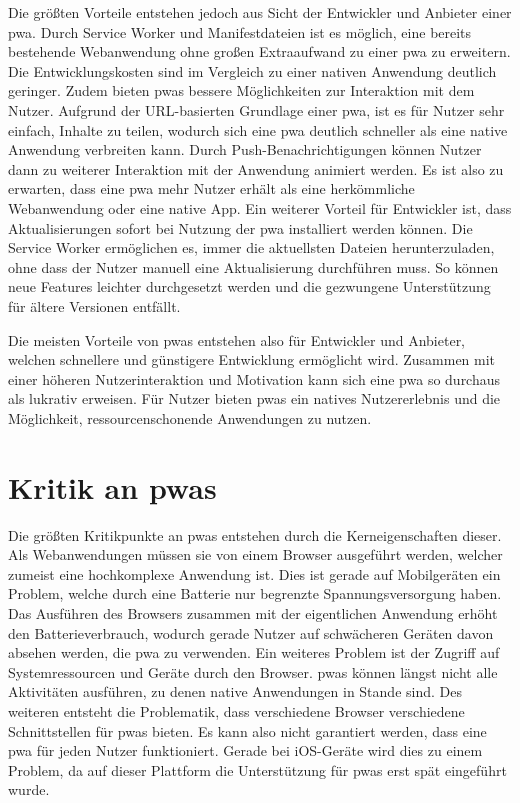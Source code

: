 \documentclass[12pt, parskip=half]{scrartcl}       %
\begin{document}
Die größten Vorteile entstehen jedoch aus Sicht der Entwickler und Anbieter einer \ac{pwa}.
Durch Service Worker und Manifestdateien ist es möglich, eine bereits bestehende Webanwendung ohne großen Extraaufwand zu einer \ac{pwa} zu erweitern.
Die Entwicklungskosten sind im Vergleich zu einer nativen Anwendung deutlich geringer.
Zudem bieten \acp{pwa} bessere Möglichkeiten zur Interaktion mit dem Nutzer.
Aufgrund der URL-basierten Grundlage einer \ac{pwa}, ist es für Nutzer sehr einfach, Inhalte zu teilen, wodurch sich eine \ac{pwa} deutlich schneller als eine native Anwendung verbreiten kann.
Durch Push-Benachrichtigungen können Nutzer dann zu weiterer Interaktion mit der Anwendung animiert werden.
Es ist also zu erwarten, dass eine \ac{pwa} mehr Nutzer erhält als eine herkömmliche Webanwendung oder eine native App.
Ein weiterer Vorteil für Entwickler ist, dass Aktualisierungen sofort bei Nutzung der \ac{pwa} installiert werden können.
Die Service Worker ermöglichen es, immer die aktuellsten Dateien herunterzuladen, ohne dass der Nutzer manuell eine Aktualisierung durchführen muss.
So können neue Features leichter durchgesetzt werden und die gezwungene Unterstützung für ältere Versionen entfällt.

Die meisten Vorteile von \acp{pwa} entstehen also für Entwickler und Anbieter, welchen schnellere und günstigere Entwicklung ermöglicht wird.
Zusammen mit einer höheren Nutzerinteraktion und Motivation kann sich eine \ac{pwa} so durchaus als lukrativ erweisen.
Für Nutzer bieten \acp{pwa} ein natives Nutzererlebnis und die Möglichkeit, ressourcenschonende Anwendungen zu nutzen.


\section{Kritik an \acp{pwa}}

Die größten Kritikpunkte an \acp{pwa} entstehen durch die Kerneigenschaften dieser.
Als Webanwendungen müssen sie von einem Browser ausgeführt werden, welcher zumeist eine hochkomplexe Anwendung ist.
Dies ist gerade auf Mobilgeräten ein Problem, welche durch eine Batterie nur begrenzte Spannungsversorgung haben.
Das Ausführen des Browsers zusammen mit der eigentlichen Anwendung erhöht den Batterieverbrauch, wodurch gerade Nutzer auf schwächeren Geräten davon absehen werden, die \ac{pwa} zu verwenden.
Ein weiteres Problem ist der Zugriff auf Systemressourcen und Geräte durch den Browser.
\acp{pwa} können längst nicht alle Aktivitäten ausführen, zu denen native Anwendungen in Stande sind.
Des weiteren entsteht die Problematik, dass verschiedene Browser verschiedene Schnittstellen für \acp{pwa} bieten.
Es kann also nicht garantiert werden, dass eine \ac{pwa} für jeden Nutzer funktioniert.
Gerade bei iOS-Geräte wird dies zu einem Problem, da auf dieser Plattform die Unterstützung für \acp{pwa} erst spät eingeführt wurde.
\end{document}
